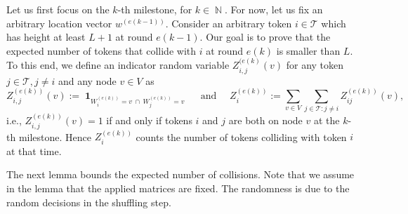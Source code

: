 \documentclass[twoside,leqno]{article}
\DeclareMathOperator{\N}{\mathbb{N}}
\DeclareMathOperator{\1}{\mathbf{1}}
\numberwithin{equation}{section}
\begin{document}
Let us first focus on the $k$-th milestone, for $k\in \N$. For now, let us fix an arbitrary location vector $w^{(e(k-1))}$. Consider an arbitrary token $i \in \mathcal{T}$ which has height at least $L+1$ at round $e(k-1)$.
Our goal is to prove that the expected number of tokens that collide with $i$ at round $e(k)$ is smaller than $L$.
To this end, we define an indicator random variable $Z_{i,j}^{(e(k)}
(v)$ for any token $j \in \mathcal{T}, j \neq i$ and any node $v \in V$ as
\[ Z_{i,j}^{(e(k))}(v) :=
\1_{ W_i^{(e(k))}=v \ \cap \ W_j^{(e(k))}=v } \quad \text{ and } \quad Z_i^{(e(k))}:=\sum_{v\in V} \sum_{j\in \mathcal{T} \colon j \neq i} Z_{ij}^{(e(k))}(v),
\]
i.e., $Z_{i,j}^{(e(k))}(v)=1$
if and only if tokens $i$ and $j$ are both on node $v$ at the $k$-th milestone.
Hence $Z_i^{(e(k))}$ counts the number of tokens colliding with token $i$ at that time.

The next lemma bounds the expected number of collisions.
Note that we assume in the lemma that the applied matrices are fixed. The randomness is due to the random decisions in the shuffling step.
\end{document}
